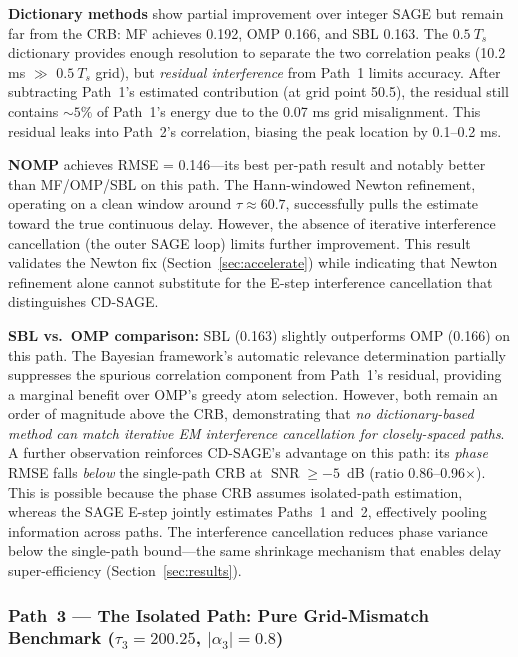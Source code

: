 \documentclass[a4paper,fleqn]{cas-dc}
\DeclareMathOperator{\SNR}{SNR}
\begin{document}
\textbf{Dictionary methods} show partial improvement over integer SAGE but remain far from the CRB: MF achieves 0.192, OMP 0.166, and SBL 0.163. The $0.5\ T_s$ dictionary provides enough resolution to separate the two correlation peaks (10.2 ms $\gg$ $0.5\ T_s$ grid), but \textit{residual interference} from Path~1 limits accuracy. After subtracting Path~1's estimated contribution (at grid point 50.5), the residual still contains $\sim 5\%$ of Path~1's energy due to the 0.07 ms grid misalignment. This residual leaks into Path~2's correlation, biasing the peak location by 0.1--0.2 ms.

\textbf{NOMP} achieves RMSE = 0.146---its best per-path result and notably better than MF/OMP/SBL on this path. The Hann-windowed Newton refinement, operating on a clean window around $\tau \approx 60.7$, successfully pulls the estimate toward the true continuous delay. However, the absence of iterative interference cancellation (the outer SAGE loop) limits further improvement. This result validates the Newton fix (Section~\ref{sec:accelerate}) while indicating that Newton refinement alone cannot substitute for the E-step interference cancellation that distinguishes CD-SAGE.

\textbf{SBL vs.\ OMP comparison:} SBL (0.163) slightly outperforms OMP (0.166) on this path. The Bayesian framework's automatic relevance determination partially suppresses the spurious correlation component from Path~1's residual, providing a marginal benefit over OMP's greedy atom selection. However, both remain an order of magnitude above the CRB, demonstrating that \textit{no dictionary-based method can match iterative EM interference cancellation for closely-spaced paths}. A further observation reinforces CD-SAGE's advantage on this path: its \textit{phase} RMSE falls \textit{below} the single-path CRB at $\SNR \ge -5$~dB (ratio 0.86--0.96$\times$). This is possible because the phase CRB assumes isolated-path estimation, whereas the SAGE E-step jointly estimates Paths~1 and~2, effectively pooling information across paths. The interference cancellation reduces phase variance below the single-path bound---the same shrinkage mechanism that enables delay super-efficiency (Section~\ref{sec:results}).

\subsubsection{Path~3 --- The Isolated Path: Pure Grid-Mismatch Benchmark ($\tau_3 = 200.25$, $|\alpha_3| = 0.8$)}
\end{document}
